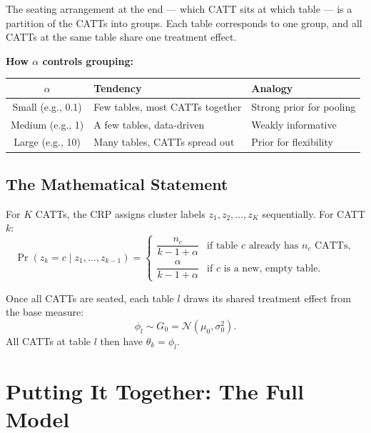 \documentclass[12pt]{article}
\begin{document}
The seating arrangement at the end --- which CATT sits at which table --- is
a partition of the CATTs into groups. Each table corresponds to one group, and
all CATTs at the same table share one treatment effect.

\textbf{How $\alpha$ controls grouping:}
\begin{center}
\begin{tabular}{cll}
\toprule
$\alpha$ & Tendency & Analogy \\
\midrule
Small (e.g., 0.1) & Few tables, most CATTs together & Strong prior for pooling \\
Medium (e.g., 1) & A few tables, data-driven & Weakly informative \\
Large (e.g., 10) & Many tables, CATTs spread out & Prior for flexibility \\
\bottomrule
\end{tabular}
\end{center}

\subsection{The Mathematical Statement}

For $K$ CATTs, the CRP assigns cluster labels
$z_1, z_2, \ldots, z_K$ sequentially. For CATT $k$:
\begin{equation}
  \Pr(z_k = c \mid z_1, \ldots, z_{k-1}) =
  \begin{cases}
    \dfrac{n_c}{k - 1 + \alpha} & \text{if table } c \text{ already has } n_c \text{ CATTs},\\[8pt]
    \dfrac{\alpha}{k - 1 + \alpha} & \text{if } c \text{ is a new, empty table.}
  \end{cases}
\end{equation}

Once all CATTs are seated, each table $l$ draws its shared treatment effect
from the base measure:
\begin{equation}
  \phi_l \sim G_0 = \mathcal{N}(\mu_0, \sigma_0^2).
\end{equation}
All CATTs at table $l$ then have $\theta_k = \phi_l$.

\section{Putting It Together: The Full Model}
\end{document}
